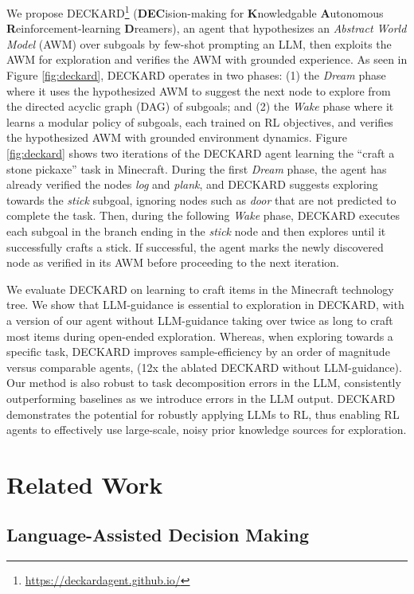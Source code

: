 \documentclass[nohyperref]{article}
\theoremstyle{plain}
\theoremstyle{definition}
\theoremstyle{remark}
\newcommand{\agentshort}{\textsc{DECKARD}}
\newcommand{\agentlong}{\textbf{DEC}ision-making for \textbf{K}nowledgable \textbf{A}utonomous \textbf{R}einforcement-learning \textbf{D}reamers}
\begin{document}
We propose \agentshort{}\footnote[1]{\href{https://deckardagent.github.io/}{https://deckardagent.github.io/}} (\agentlong), an agent that hypothesizes an \emph{Abstract World Model} (AWM) over subgoals by few-shot prompting an LLM, then exploits the AWM for exploration and verifies the AWM with grounded experience.
As seen in Figure \ref{fig:deckard}, \agentshort{} operates in two phases: (1) the \emph{Dream} phase where it uses the hypothesized AWM to suggest the next node to explore from the directed acyclic graph (DAG) of subgoals; and (2) the \emph{Wake} phase where it learns a modular policy of subgoals, each trained on RL objectives, and verifies the hypothesized AWM with grounded environment dynamics.
Figure \ref{fig:deckard} shows two iterations of the \agentshort{} agent learning the ``craft a stone pickaxe'' task in Minecraft.
During the first \emph{Dream} phase, the agent has already verified the nodes \emph{log} and \emph{plank}, and \agentshort{} suggests exploring towards the \emph{stick} subgoal, ignoring nodes such as \emph{door} that are not predicted to complete the task.
Then, during the following \emph{Wake} phase, \agentshort{} executes each subgoal in the branch ending in the \emph{stick} node and then explores until it successfully crafts a stick.
If successful, the agent marks the newly discovered node as verified in its AWM before proceeding to the next iteration.

We evaluate \agentshort{} on learning to craft items in the Minecraft technology tree.
We show that LLM-guidance is essential to exploration in \agentshort{}, with a version of our agent without LLM-guidance taking over twice as long to craft most items during open-ended exploration.
Whereas, when exploring towards a specific task, \agentshort{} improves sample-efficiency by an order of magnitude versus comparable agents, (12x the ablated \agentshort{} without LLM-guidance).
Our method is also robust to task decomposition errors in the LLM, consistently outperforming baselines as we introduce errors in the LLM output. 
\agentshort{} demonstrates the potential for robustly applying LLMs to RL, thus enabling RL agents to effectively use large-scale, noisy prior knowledge sources for exploration. 

\section{Related Work}

\subsection{Language-Assisted Decision Making}
\end{document}
